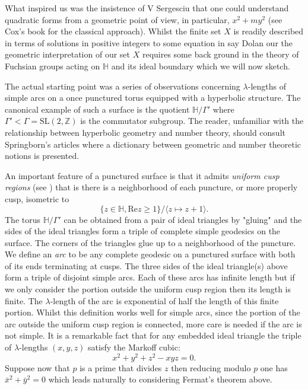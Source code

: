 \documentclass[12pt,a4paper]{amsart}
\def\HH{\mathbb{H}}
\def\ZZ{\mathbb{Z}}
\def\sl2{\mathrm{SL}(2, \ZZ)}
\begin{document}
What inspired us was the insistence of V Sergesciu that one could understand quadratic forms from a geometric point of view, in particular, $x^2 + my^2$
(see Cox's book \cite{cox} for the classical approach).
Whilst the finite set $X$ is readily described in terms of solutions
in positive integers to some equation in say Dolan \cite{dolan} our
the geometric interpretation of our set $X$ requires some back
ground in the theory of Fuchsian groups acting on $\mathbb{H}$ and
its ideal boundary which we will now sketch.


The actual starting point was a series of observations
concerning $\lambda$-lengths of simple arcs on a once punctured
torus equipped with a hyperbolic structure.
The canonical  example of such a surface is the quotient $\HH/\Gamma'$
where $\Gamma' < \Gamma = \sl2$ is the commutator subgroup. 
The reader, unfamiliar with the relationship between hyperbolic
geometry and number theory,
should consult Springborn's articles \cite{springborn1, springborn2}
where a dictionary between geometric and number theoretic notions is presented.

An important
feature of a punctured surface is that it admits \textit{uniform
cusp regions} (see \cite{Shimizu}) that is there is a neighborhood of each puncture, or more properly cusp, isometric to 
$$\{z\in \mathbb{H}, \mathrm{Re}z \geq 1\}/\langle z \mapsto z+1
\rangle.$$  
The  torus $\mathbb{H}/\Gamma'$ can
be obtained from a pair of ideal triangles by "gluing" and the sides
of the ideal triangles form a triple of complete simple geodesics on
the surface. The corners of the triangles glue up to a neighborhood
of the puncture. We define an \textit{arc} to
be any complete geodesic on a punctured surface with both of its
ends terminating at cusps. The three sides of the ideal triangle(s)
above form a triple of disjoint simple arcs. Each of these arcs has
infinite length but if we only consider the portion outside the
uniform cusp region then its length is finite. The $\lambda$-length
of the arc is exponential of half the length of this finite portion.
Whilst this definition works well for simple arcs, since the portion of
the arc
outside the uniform cusp region is connected, more care is needed if
the arc is not simple.
It is a remarkable fact that for any embedded ideal triangle the
triple of $\lambda$-lengths $(x,y,z)$ satisfy the Markoff cubic:
\begin{equation}
	x^2 + y^2 + z^2 - xyz = 0.
\end{equation}
Suppose now that $p$ is a prime that divides $z$ 
then reducing modulo $p$ one has $\bar{x}^2 + \bar{y}^2 = 0$ which
leads naturally to considering Fermat's theorem above.
\end{document}
